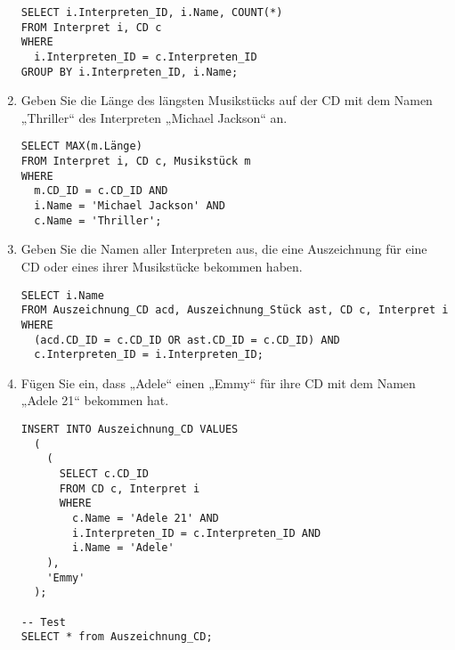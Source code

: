 \documentclass{bschlangaul-aufgabe}
\begin{document}
\begin{enumerate}
\begin{bAntwort}
\begin{verbatim}
SELECT i.Interpreten_ID, i.Name, COUNT(*)
FROM Interpret i, CD c
WHERE
  i.Interpreten_ID = c.Interpreten_ID
GROUP BY i.Interpreten_ID, i.Name;
\end{verbatim}
\end{bAntwort}


\item Geben Sie die Länge des längsten Musikstücks auf der CD mit dem
Namen „Thriller“ des Interpreten „Michael Jackson“ an.

\begin{bAntwort}
\begin{verbatim}
SELECT MAX(m.Länge)
FROM Interpret i, CD c, Musikstück m
WHERE
  m.CD_ID = c.CD_ID AND
  i.Name = 'Michael Jackson' AND
  c.Name = 'Thriller';
\end{verbatim}
\end{bAntwort}


\item Geben Sie die Namen aller Interpreten aus, die eine Auszeichnung
für eine CD oder eines ihrer Musikstücke bekommen haben.

\begin{bAntwort}
\begin{verbatim}
SELECT i.Name
FROM Auszeichnung_CD acd, Auszeichnung_Stück ast, CD c, Interpret i
WHERE
  (acd.CD_ID = c.CD_ID OR ast.CD_ID = c.CD_ID) AND
  c.Interpreten_ID = i.Interpreten_ID;
\end{verbatim}
\end{bAntwort}


\item Fügen Sie ein, dass „Adele“ einen „Emmy“ für ihre CD mit dem Namen
„Adele 21“ bekommen hat.

\begin{bAntwort}
\begin{verbatim}
INSERT INTO Auszeichnung_CD VALUES
  (
    (
      SELECT c.CD_ID
      FROM CD c, Interpret i
      WHERE
        c.Name = 'Adele 21' AND
        i.Interpreten_ID = c.Interpreten_ID AND
        i.Name = 'Adele'
    ),
    'Emmy'
  );

-- Test
SELECT * from Auszeichnung_CD;
\end{verbatim}
\end{bAntwort}


\end{enumerate}
\end{document}
